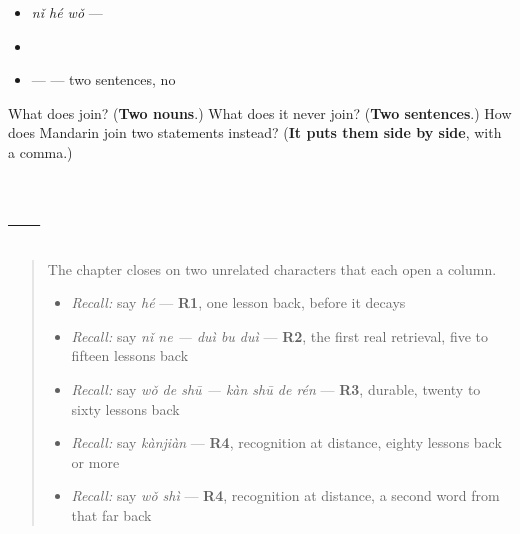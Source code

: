\begin{itemize}
\raggedright
  \item \emph{nǐ hé wǒ} — 
  \item {}
  \item {} —  — two sentences, no 
\end{itemize}

\begin{tcolorbox}[breakable,colback=teal!4,colframe=teal!35!black,title={Before you move on}]
What does  join? (\textbf{Two nouns}.) What does it never join? (\textbf{Two sentences}.) How does Mandarin join two statements instead? (\textbf{It puts them side by side}, with a comma.)
\end{tcolorbox}
\section[Practice]{ — }

\label{lesson:ZH-C27-practice}



\begin{quote}
The chapter closes on two unrelated characters that each open a column.

\begin{itemize}
\raggedright
  \item \emph{Recall:} say \emph{hé} — \textbf{R1}, one lesson back, before it decays
  \item \emph{Recall:} say \emph{nǐ ne — duì bu duì} — \textbf{R2}, the first real retrieval, five to fifteen lessons back
  \item \emph{Recall:} say \emph{wǒ de shū — kàn shū de rén} — \textbf{R3}, durable, twenty to sixty lessons back
  \item \emph{Recall:} say \emph{kànjiàn} — \textbf{R4}, recognition at distance, eighty lessons back or more
  \item \emph{Recall:} say \emph{wǒ shì} — \textbf{R4}, recognition at distance, a second word from that far back
\end{itemize}
\end{quote}

